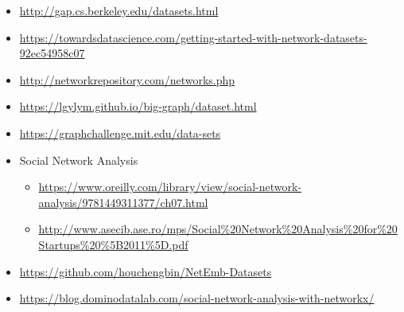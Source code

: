 \begin{itemize}
    \item \url{http://gap.cs.berkeley.edu/datasets.html}
    \item \url{https://towardsdatascience.com/getting-started-with-network-datasets-92ec54958c07}
    \item \url{http://networkrepository.com/networks.php}
    \item \url{https://lgylym.github.io/big-graph/dataset.html}
    \item \url{https://graphchallenge.mit.edu/data-sets}
    \item Social Network Analysis
    \begin{itemize}
        \item \url{https://www.oreilly.com/library/view/social-network-analysis/9781449311377/ch07.html}
        \item \url{http://www.asecib.ase.ro/mps/Social%20Network%20Analysis%20for%20Startups%20%5B2011%5D.pdf}
    \end{itemize}
    \item \url{https://github.com/houchengbin/NetEmb-Datasets}
    \item \url{https://blog.dominodatalab.com/social-network-analysis-with-networkx/}
\end{itemize}
